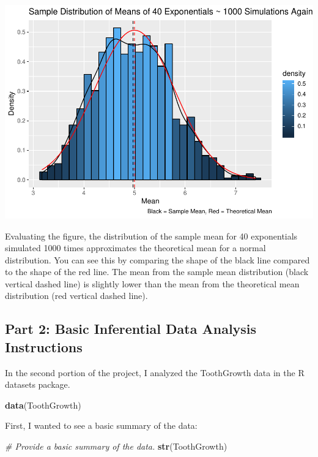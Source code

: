 \documentclass[]{article}
\newenvironment{Shaded}{\begin{snugshade}}{\end{snugshade}}
\newcommand{\KeywordTok}[1]{\textcolor[rgb]{0.13,0.29,0.53}{\textbf{#1}}}
\newcommand{\CommentTok}[1]{\textcolor[rgb]{0.56,0.35,0.01}{\textit{#1}}}
\newcommand{\NormalTok}[1]{#1}
\begin{document}
\includegraphics{figures/fig-dist-1.pdf}

Evaluating the figure, the distribution of the sample mean for 40
exponentials simulated 1000 times approximates the theoretical mean for
a normal distribution. You can see this by comparing the shape of the
black line compared to the shape of the red line. The mean from the
sample mean distribution (black vertical dashed line) is slightly lower
than the mean from the theoretical mean distribution (red vertical
dashed line).

\subsection{Part 2: Basic Inferential Data Analysis
Instructions}\label{part-2-basic-inferential-data-analysis-instructions}

In the second portion of the project, I analyzed the ToothGrowth data in
the R datasets package.

\begin{Shaded}
\begin{Highlighting}[]
        \KeywordTok{data}\NormalTok{(ToothGrowth)}
\end{Highlighting}
\end{Shaded}

First, I wanted to see a basic summary of the data:

\begin{Shaded}
\begin{Highlighting}[]
        \CommentTok{# Provide a basic summary of the data.}
        \KeywordTok{str}\NormalTok{(ToothGrowth)}
\end{Highlighting}
\end{Shaded}
\end{document}
